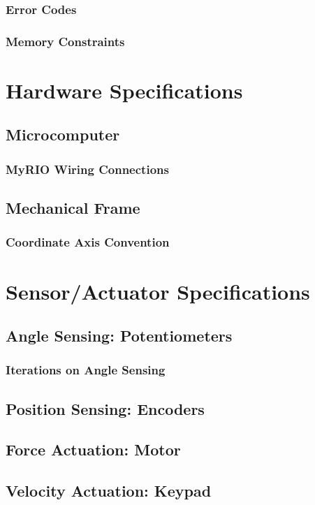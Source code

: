 \documentclass[letterpaper]{article}
\begin{document}
\subsubsection{Error Codes}
\subsubsection{Memory Constraints}

\newpage
\section{Hardware Specifications}
\subsection{Microcomputer}
\subsubsection{MyRIO Wiring Connections}
\subsection{Mechanical Frame}
\subsubsection{Coordinate Axis Convention}

\section{Sensor/Actuator Specifications}
\subsection{Angle Sensing: Potentiometers}
\subsubsection{Iterations on Angle Sensing}
\subsection{Position Sensing: Encoders}
\subsection{Force Actuation: Motor}
\subsection{Velocity Actuation: Keypad}
\end{document}
